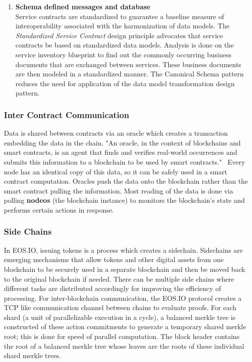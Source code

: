 \documentclass[]{article}
\begin{document}
\begin{enumerate}
	\item \textbf{Schema defined messages and database} \\
	Service contracts are standardized to guarantee a baseline measure of interoperability associated with the harmonization of data models.
	The \textit{Standardized Service Contract} design principle advocates that service contracts be based on standardized data models. 
	Analysis is done on the service inventory blueprint to find out the commonly occurring business documents that are exchanged between services. 
	These business documents are then modeled in a standardized manner. 
	The Canonical Schema pattern reduces the need for application of the data model transformation design pattern.
	\cite{1}
	
		
\end{enumerate}
	 
	\subsubsection{Inter Contract Communication}
	Data is shared between contracts via an oracle which creates a transaction embedding the data in the chain. 
	"An oracle, in the context of blockchains and smart contracts, is an agent that finds and verifies real-world occurrences 
	and submits this information to a blockchain to be used by smart contracts."\ 
	\cite{2}
	Every node has an identical copy of this data, so it can be safely used in a smart contract computation.
	Oracles push the data onto the blockchain rather than the smart contract pulling the information.
	Most reading of the data is done via polling \textbf{nodeos} (the blockchain instance) to monitors the blockchain's state 
	and performs certain actions in response. 
	
	
	\subsubsection{Side Chains}
	In EOS.IO, issuing tokens is a process which creates a sidechain. 
	Sidechains are emerging mechanisms that allow tokens and other digital assets from one blockchain 
	to be securely used in a separate blockchain and then be moved back to the original blockchain if needed. 
	There can be multiple side chains where different tasks are distributed accordingly for improving the efficiency of processing. 	
	For inter-blockchain communication, the EOS.IO protocol creates a TCP like communication channel between chains to evaluate proofs.
	For each shard (a unit of parallelizable execution in a cycle), a balanced merkle tree is constructed of these action commitments 
	to generate a temporary shared merkle root; 
	this is done for speed of parallel computation. 
	The block header contains the root of a balanced merkle tree whose leaves are the roots of these individual shard merkle trees.
	\cite{3} 
\end{document}
